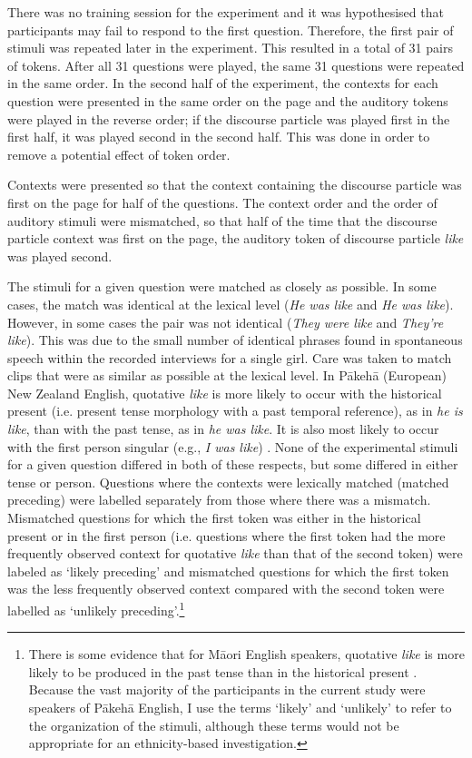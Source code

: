 There was no training session for the experiment and it was hypothesised that participants may fail to respond to the first question.  Therefore, the first pair of stimuli was repeated later in the experiment.   This resulted in a total of 31 pairs of tokens.  After all 31 questions were played, the same 31 questions were repeated in the same order.  In the second half of the experiment, the contexts for each question were presented in the same order on the page and the auditory tokens were played in the reverse order; if the discourse particle was played first in the first half, it was played second in the second half.  This was done in order to remove a potential effect of token order.

Contexts were presented so that the context containing the discourse particle was first on the page for half of the questions.  The context order and the order of auditory stimuli were mismatched, so that half of the time that the discourse particle context was first on the page, the auditory token of discourse particle \textit{like} was played second.  

The stimuli for a given question were matched as closely as possible.  In some cases, the match was identical at the lexical level (\textit{He was like} and \textit{He was like}).  However, in some cases the pair was not identical (\textit{They were like} and \textit{They're like}).  This was due to the small number of identical phrases found in spontaneous speech within the recorded interviews for a single girl.  Care was taken to match clips that were as similar as possible at the lexical level.  In P\=akeh\=a (European) New Zealand English, quotative \textit{like} is more likely to occur with the historical present (i.e. present tense morphology with a past temporal reference), as in \textit{he is like}, than with the past tense, as in \textit{he was like}.  It is also most likely to occur with the first person singular (e.g., \textit{I was like}) \cite{buchstallerdarcy2009}.  None of the experimental stimuli for a given question differed in both of these respects, but some differed in either tense or person.  Questions where the contexts were lexically matched (matched preceding) were labelled separately from those where there was a mismatch. Mismatched questions for which the first token was either in the historical present or in the first person (i.e. questions where the first token had the more frequently observed context for quotative \textit{like} than that of the second token) were labeled as `likely preceding' and mismatched questions for which the first token was the less frequently observed context compared with the second token were labelled as `unlikely preceding'.\footnote{There is some evidence that for M\=aori English speakers, quotative \textit{like} is more likely to be produced in the past tense than in the historical present \cite{darcy2008}.  Because the vast majority of the participants in the current study were speakers of P\=akeh\=a English, I use the terms `likely' and `unlikely' to refer to the organization of the stimuli, although these terms would not be appropriate for an ethnicity-based investigation.}

